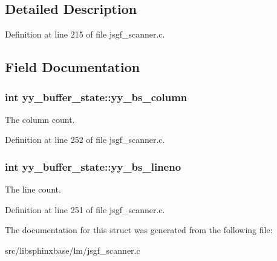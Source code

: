 \subsection{\-Detailed \-Description}


\-Definition at line 215 of file jsgf\-\_\-scanner.\-c.



\subsection{\-Field \-Documentation}
\subsubsection[{yy\-\_\-bs\-\_\-column}]{\setlength{\rightskip}{0pt plus 5cm}int {\bf yy\-\_\-buffer\-\_\-state\-::yy\-\_\-bs\-\_\-column}}\label{structyy__buffer__state_a10c4fcd8be759e6bf11e6d3e8cdb0307}


\-The column count. 



\-Definition at line 252 of file jsgf\-\_\-scanner.\-c.

\subsubsection[{yy\-\_\-bs\-\_\-lineno}]{\setlength{\rightskip}{0pt plus 5cm}int {\bf yy\-\_\-buffer\-\_\-state\-::yy\-\_\-bs\-\_\-lineno}}\label{structyy__buffer__state_a818e94bc9c766e683c60df1e9fd01199}


\-The line count. 



\-Definition at line 251 of file jsgf\-\_\-scanner.\-c.



\-The documentation for this struct was generated from the following file\-:\begin{DoxyCompactItemize}
\item 
src/libsphinxbase/lm/jsgf\-\_\-scanner.\-c\end{DoxyCompactItemize}
